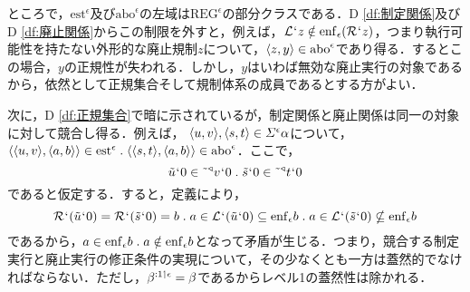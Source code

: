 ところで，$ \mathrm{est}^\epsilon $及び$ \mathrm{abo}^\epsilon $の左域は$ \mathrm{REG}^\epsilon $の部分クラスである．D \ref{df:制定関係}及びD \ref{df:廃止関係}からこの制限を外すと，例えば，$\mathcal{L}{\mspace{1mu}{`}\mspace{1mu}} z\notin \mathrm{enf}_{\epsilon}(\mathcal{R}{\mspace{1mu}{`}\mspace{1mu}} z)$，つまり執行可能性を持たない外形的な廃止規制$z$について，$\langle z,y \rangle\in\mathrm{abo}^\epsilon$であり得る．するとこの場合，$y$の正規性が失われる．しかし，$y$はいわば無効な廃止実行の対象であるから，依然として正規集合そして規制体系の成員であるとする方がよい．

次に，D \ref{df:正規集合}で暗に示されているが，制定関係と廃止関係は同一の対象に対して競合し得る．例えば，
$ \langle u,v \rangle,\langle s,t \rangle\in\varSigma^{\epsilon}\alpha $について，$ \orp{\orp{u,v},\orp{a,b}}\in\mathrm{est}^\epsilon\con{1}\orp{\orp{s,t},\orp{a,b}}\in \mathrm{abo}^\epsilon $．ここで，
\[
    \tilde{u}\fap 0\in \tildel{\trgl{v}}\fap 0\con{1}\tilde{s}\fap 0\in \tildel{\trgl{t}}\fap 0
\]
であると仮定する．すると，定義により，
\[
    \mathcal{R}\fap(\tilde{u}\fap 0) = \mathcal{R}\fap(\tilde{s}\fap 0) = b \con{1}
    a\in \mathcal{L}\fap(\tilde{u}\fap 0)\subseteq \enf{\epsilon}b \con{1}
    a\in \mathcal{L}\fap(\tilde{s}\fap 0)\nsubseteq \enf{\epsilon}b
\]
であるから，$ a\in\enf{\epsilon}b\con{1}a\notin\enf{\epsilon}b $となって矛盾が生じる．つまり，競合する制定実行と廃止実行の修正条件の実現について，その少なくとも一方は蓋然的でなければならない．ただし，$ \beta^{:1\mathbin{\upharpoonleft}\epsilon}=\beta $であるからレベル1の蓋然性は除かれる．


